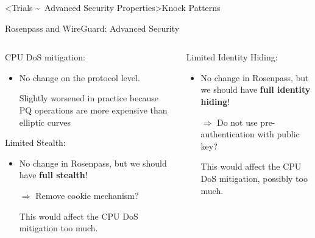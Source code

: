 \interlude[4]<Trials \textasciitilde\ Advanced Security Properties>{Knock Patterns}

\begin{frame}{Rosenpass and WireGuard: Advanced Security}
\vspace*{-\baselineskip}
\small
\begin{columns}[fullwidth,T]
	\setlength{}
  \begin{column}{.48\linewidth}
    \begin{block}{\strut CPU DoS mitigation:}
    \begin{itemize}
      \item No change on the protocol level.
      \item[{\Sey[][green!60!white]} ] Slightly worsened in practice because PQ operations are more expensive than elliptic curves
    \end{itemize}
        \unskip
    \end{block}
    \begin{block}{\strut Limited Stealth:}
    \begin{itemize}
      \item No change in Rosenpass, but we should have \textbf{full stealth}!
      \item[$\Rightarrow$] Remove cookie mechanism?
      \item[{\Sey[][green!60!white]} ] This would affect the CPU DoS mitigation too much.
    \end{itemize}
    \unskip
    \end{block}

  \end{column}

  \begin{column}{.48\linewidth}
    \begin{block}{\strut Limited Identity Hiding:}
    \begin{itemize}
      \item No change in Rosenpass, but we should have \textbf{full identity hiding}!
      \item[$\Rightarrow$] Do not use pre-authentication with public key?
      \item[{\Sey[][green!60!white]} ] This would affect the CPU DoS mitigation, possibly too much.
    \end{itemize}
        \unskip
    \end{block}
  \end{column}
\end{columns}
\end{frame}

